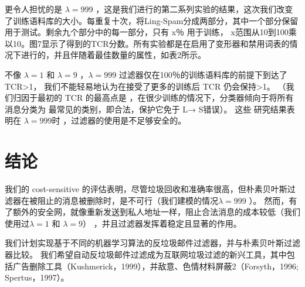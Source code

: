 \documentclass[UTF8]{ctexart}
\begin{document}
更令人担忧的是 $\lambda=999$ ，这是我们进行的第二系列实验的结果，这次我们改变了训练语料库的大小。每重复十次，将Ling-Spam分成两部分，其中一个部分保留用于测试。剩余九个部分中的每一部分，只有 x％ 用于训练， x范围从10到100乘以10。图7显示了得到的TCR分数。所有实验都是在启用了变形器和禁用词表的情况下进行的，并且伴随着最佳数量的属性，如表2所示。

不像 $\lambda=1$ 和 $\lambda=9$ ，$\lambda=999$ 过滤器仅在100％的训练语料库的前提下到达了 TCR>1， 我们不能轻易地认为在接受了更多的训练后 TCR 仍会保持>1。 （我们归因于最初的 TCR 的最高点是 ，在很少训练的情况下，分类器倾向于将所有消息分类为 最常见的类别，即合法，保护它免于 L→ S错误）。 这些 研究结果表明在 $\lambda=999$时 ，过滤器的使用是不足够安全的。

\section{结论}
我们的 cost-sensitive 的评估表明，尽管垃圾回收和准确率很高，但朴素贝叶斯过滤器在被阻止的消息被删除时，是不可行（我们建模的情况$ \lambda=999$ ）。 然而，有了额外的安全网，就像重新发送到私人地址一样，阻止合法消息的成本较低（我们使用过$ \lambda=1$ 和 $\lambda=9$） ，并且过滤器发挥着稳定且显著的作用。

我们计划实现基于不同的机器学习算法的反垃圾邮件过滤器，并与朴素贝叶斯过滤器比较。 我们希望自动反垃圾邮件过滤成为互联网垃圾过滤的新兴工具，其中包括广告删除工具（Kushmerick，1999），并敌意、色情材料屏蔽2（Forsyth，1996; Spertus，1997）。
\end{document}
